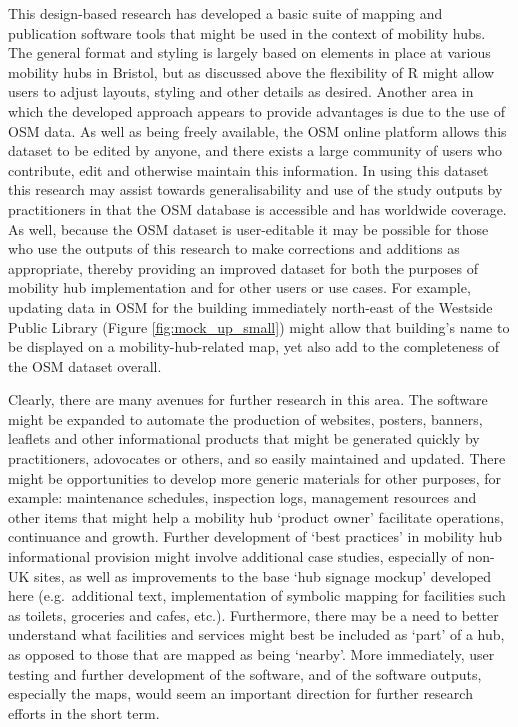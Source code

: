 \documentclass[preprint, 3p,
authoryear]{elsarticle} %
\begin{document}
This design-based research has developed a basic suite of mapping and
publication software tools that might be used in the context of mobility
hubs. The general format and styling is largely based on elements in
place at various mobility hubs in Bristol, but as discussed above the
flexibility of R might allow users to adjust layouts, styling and other
details as desired. Another area in which the developed approach appears
to provide advantages is due to the use of OSM data. As well as being
freely available, the OSM online platform allows this dataset to be
edited by anyone, and there exists a large community of users who
contribute, edit and otherwise maintain this information. In using this
dataset this research may assist towards generalisability and use of the
study outputs by practitioners in that the OSM database is accessible
and has worldwide coverage. As well, because the OSM dataset is
user-editable it may be possible for those who use the outputs of this
research to make corrections and additions as appropriate, thereby
providing an improved dataset for both the purposes of mobility hub
implementation and for other users or use cases. For example, updating
data in OSM for the building immediately north-east of the Westside
Public Library (Figure \ref{fig:mock_up_small}) might allow that
building's name to be displayed on a mobility-hub-related map, yet also
add to the completeness of the OSM dataset overall.

Clearly, there are many avenues for further research in this area. The
software might be expanded to automate the production of websites,
posters, banners, leaflets and other informational products that might
be generated quickly by practitioners, adovocates or others, and so
easily maintained and updated. There might be opportunities to develop
more generic materials for other purposes, for example: maintenance
schedules, inspection logs, management resources and other items that
might help a mobility hub `product owner' facilitate operations,
continuance and growth. Further development of `best practices' in
mobility hub informational provision might involve additional case
studies, especially of non-UK sites, as well as improvements to the base
`hub signage mockup' developed here (e.g.~additional text,
implementation of symbolic mapping for facilities such as toilets,
groceries and cafes, etc.). Furthermore, there may be a need to better
understand what facilities and services might best be included as `part'
of a hub, as opposed to those that are mapped as being `nearby'. More
immediately, user testing and further development of the software, and
of the software outputs, especially the maps, would seem an important
direction for further research efforts in the short term.
\end{document}
